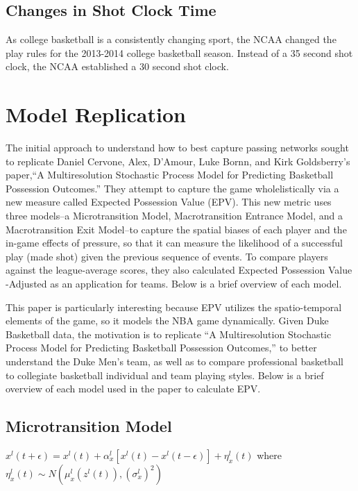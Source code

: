 \documentclass[12pt,twoside]{dukestatscithesis}
\theoremstyle{definition}
\theoremstyle{definition}
\theoremstyle{definition}
\theoremstyle{remark}
\begin{document}
\section{Changes in Shot Clock Time}\label{changes-in-shot-clock-time}

As college basketball is a consistently changing sport, the NCAA changed
the play rules for the 2013-2014 college basketball season. Instead of a
35 second shot clock, the NCAA established a 30 second shot clock.

\chapter{Model Replication}\label{model-replication}

The initial approach to understand how to best capture passing networks
sought to replicate Daniel Cervone, Alex, D'Amour, Luke Bornn, and Kirk
Goldsberry's paper,``A Multiresolution Stochastic Process Model for
Predicting Basketball Possession Outcomes.'' They attempt to capture the
game wholelistically via a new measure called Expected Possession Value
(EPV). This new metric uses three models--a Microtransition Model,
Macrotransition Entrance Model, and a Macrotransition Exit Model--to
capture the spatial biases of each player and the in-game effects of
pressure, so that it can measure the likelihood of a successful play
(made shot) given the previous sequence of events. To compare players
against the league-average scores, they also calculated Expected
Possession Value -Adjusted as an application for teams. Below is a brief
overview of each model.

This paper is particularly interesting because EPV utilizes the
spatio-temporal elements of the game, so it models the NBA game
dynamically. Given Duke Basketball data, the motivation is to replicate
``A Multiresolution Stochastic Process Model for Predicting Basketball
Possession Outcomes,'' to better understand the Duke Men's team, as well
as to compare professional basketball to collegiate basketball
individual and team playing styles. Below is a brief overview of each
model used in the paper to calculate EPV.

\section{Microtransition Model}\label{microtransition-model}

\(x^{l}(t+\epsilon) = x^{l}(t) + \alpha^{l}_{x}[x^{l}(t) - x^{l}(t-\epsilon)] + \eta^{l}_{x}(t)\)
where
\(\eta^{l}_{x}(t) \sim N(\mu^{l}_{x}(z^{l}(t)), (\sigma^{l}_{x})^{2})\)
\end{document}
